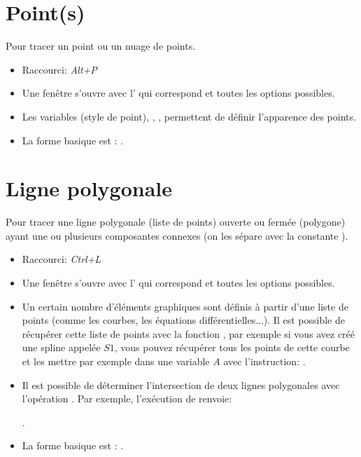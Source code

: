 \section{Point(s)}

Pour tracer un point ou un nuage de points.

\begin{itemize}
\item Raccourci: \textsl{Alt+P}
\item Une fenêtre s'ouvre avec l' qui correspond et toutes les options possibles.
\item Les variables  (style de point), , ,  permettent de définir l'apparence des points.
\item La forme basique est : .
\end{itemize}

\section{Ligne polygonale}

Pour tracer une ligne polygonale (liste de points) ouverte ou fermée (polygone) ayant une ou plusieurs composantes
connexes (on les sépare avec la constante \jump).

\begin{itemize}
\item Raccourci: \textsl{Ctrl+L}
\item Une fenêtre s'ouvre avec l' qui correspond et toutes les options possibles.
\item Un certain nombre d'éléments graphiques sont définis à partir d'une liste de points (comme les courbes, les équations différentielles...). Il est possible de récupérer cette liste de points avec la fonction , par exemple si vous avez créé une spline appelée $S1$, vous pouvez récupérer tous les points de cette courbe et les mettre par exemple dans une variable $A$ avec l'instruction: .
\item Il est possible de déterminer l'intersection de deux lignes polygonales avec l'opération . Par exemple, l'exécution de  renvoie:

\centerline{\res{[0,0.999368819693+0.999368819693*i]}.}

\item La forme basique est : .
\end{itemize}


